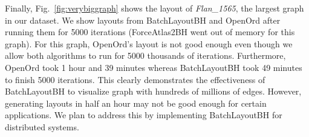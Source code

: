 \documentclass{vgtc}
\newcommand{\toolname}{{BatchLayout}}
\newcommand{\toolnameBH}{{BatchLayoutBH}}
\begin{document}
Finally, Fig.~\ref{fig:verybiggraph} shows the layout of \emph{Flan\_1565}, the largest graph in our dataset.
We show layouts from \toolnameBH{} and OpenOrd after running them for 5000 iterations (ForceAtlas2BH went out of memory for this graph).
For this graph,  OpenOrd's layout is not good enough even though we allow both algorithms to run for 5000 thousands of iterations. 
Furthermore, OpenOrd took 1 hour and 39 minutes whereas \toolnameBH{} took 49 minutes to finish 5000 iterations. 
This clearly demonstrates the effectiveness of \toolnameBH{} to visualize graph with hundreds of millions of edges.
However, generating layouts in half an hour may not be good enough for certain applications.
We plan to address this by implementing  \toolnameBH{} for distributed systems.



\end{document}
